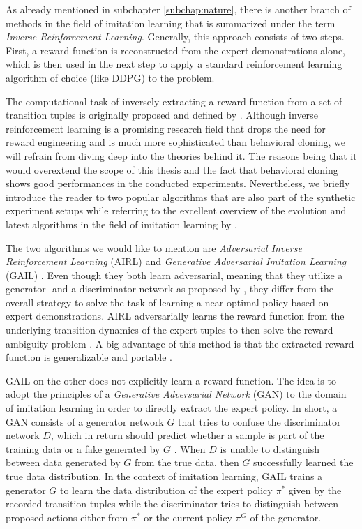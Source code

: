 As already mentioned in subchapter \ref{subchap:nature}, there is another branch of methods in the field of imitation learning that is summarized under the term \textit{Inverse Reinforcement Learning}. Generally, this approach consists of two steps. First, a reward function is reconstructed from the expert demonstrations alone, which is then used in the next step to apply a standard reinforcement learning algorithm of choice (like DDPG) to the problem.
\par
The computational task of inversely extracting a reward function from a set of transition tuples is originally proposed and defined by \cite{russell1998learning}. Although inverse reinforcement learning is a promising research field that drops the need for reward engineering and is much more sophisticated than behavioral cloning, we will refrain from diving deep into the theories behind it. The reasons being that it would overextend the scope of this thesis and the fact that behavioral cloning shows good performances in the conducted experiments. Nevertheless, we briefly introduce the reader to two popular algorithms that are also part of the synthetic experiment setups while referring to the excellent overview of the evolution and latest algorithms in the field of imitation learning by \cite{zheng2021imitation}.
\par
The two algorithms we would like to mention are  \textit{Adversarial Inverse Reinforcement Learning} (AIRL) \cite[]{fu2017learning} and \textit{Generative Adversarial Imitation Learning} (GAIL) \cite[]{ho2016generative}. Even though they both learn adversarial, meaning that they utilize a generator- and a discriminator network as proposed by \cite{goodfellow2014generative}, they differ from the overall strategy to solve the task of learning a near optimal policy based on expert demonstrations. AIRL adversarially learns the 
reward function from the underlying transition dynamics of the expert tuples to then solve the reward ambiguity problem \cite[pp.~4-5]{fu2017learning}. A big advantage of this method is that the extracted reward function is generalizable and portable \cite[p.~1735]{wang2020deep}.
\par
GAIL on the other does not explicitly learn a reward function. The idea is to adopt the principles of a \textit{Generative Adversarial Network} (GAN) to the domain of imitation learning in order to directly extract the expert policy. In short, a GAN consists of a generator network $G$ that tries to confuse the discriminator network $D$, which in return should predict whether a sample is part of the training data or a fake generated by $G$ \cite[p.~1]{goodfellow2014generative}. When $D$ is unable to distinguish between data generated by $G$ from the true data, then $G$ successfully learned the true data distribution. In the context of imitation learning, GAIL trains a generator $G$ to learn the data distribution of the expert policy $\pi^*$ given by the recorded transition tuples while the discriminator tries to distinguish between proposed actions either from $\pi^*$ or the current policy $\pi^G$ of the generator.
